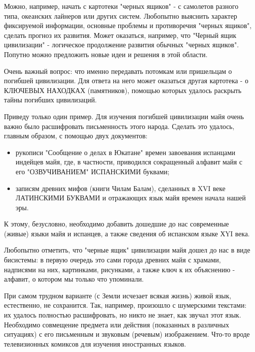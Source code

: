 \documentclass[11pt,a4paper]{article}
\begin{document}
Можно, например, начать с картотеки "черных ящиков" - с самолетов разного
типа, океанских лайнеров или других систем. Любопытно выяснить характер
фиксируемой информации, основные проблемы и противоречия "черных ящиков",
сделать прогноз их развития. Может оказаться, например, что "Черный ящик
цивилизации" - логическое продолжение развития обычных "черных
ящиков". Попутно можно предложить новые идеи и решения в этой области.

Очень важный вопрос: что именно передавать потомкам или пришельцам о погибшей
цивилизации. Для ответа на него может оказаться другая картотека - о КЛЮЧЕВЫХ
НАХОДКАХ (памятников), помощью которых удалось раскрыть тайны погибших
цивилизаций.
\medskip

Приведу только один пример. Для изучения погибшей цивилизации майя очень важно было расшифровать письменность этого народа. Сделать это удалось, главным образом, с помощью двух документов:
\begin{itemize}
\item рукописи "Сообщение о делах в Юкатане" времен завоевания испанцами
  индейцев майя, где, в частности, приводился сокращенный алфавит майя с его
  "ОЗВУЧИВАНИЕМ" ИСПАНСКИМИ буквами;
\item записям древних мифов (книги Чилам Балам), сделанных в XVI веке
  ЛАТИНСКИМИ БУКВАМИ и отражающих язык майя времен начала нашей эры.
\end{itemize}
К этому, безусловно, необходимо добавить дошедшие до нас современные (живые)
языки майя и испанцев, а также сведения об испанском языке ХYI века.

Любопытно отметить, что "черные ящик" цивилизации майя дошел до нас в виде
бисистемы: в первую очередь это сами города древних майя с храмами, надписями
на них, картинками, рисунками, а также ключ к их объяснению - алфавит, о
котором мы только что упоминали.
\medskip

При самом трудном варианте (с Земли исчезает всякая жизнь) живой язык,
естественно, не сохранится. Так, например, произошло с шумерскими текстами: их
удалось полностью расшифровать, но никто не знает, как звучал этот
язык. Необходимо совмещение предмета или действия (показанных в различных
ситуациях) с его письменным и звуковым (речевым) изображением. Что-то вроде
телевизионных комиксов для изучения иностранных языков.
\end{document}
